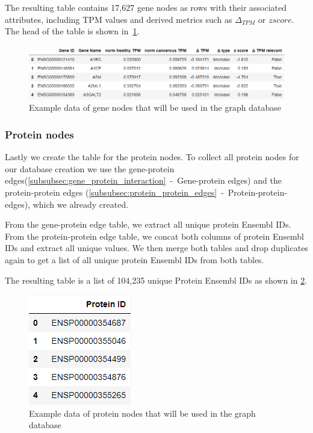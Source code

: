 The resulting table contains 17,627 gene nodes as rows with their associated attributes,
including TPM values and derived metrics such as $\Delta_{TPM}$ or $z score$.
The head of the table is shown in~\cref{fig:03_02_df_gene_nodes}.

\begin{figure}[h]
    \centering
    \includegraphics[height=\dfheight]{figures/03_02_gene_nodes}
    \caption{Example data of gene nodes that will be used in the graph database}
    \label{fig:03_02_df_gene_nodes}
\end{figure}




\subsubsection*{Protein nodes} \label{subsubsec:protein_nodes}
Lastly we create the table for the protein nodes.
To collect all protein nodes for our database creation we use the gene-protein edges(\cref{subsubsec:gene_protein_interaction}~-~Gene-protein edges)
and the protein-protein edges (\ref{subsubsec:protein_protein_edges}~-~Protein-protein-edges), which we already created.

From the gene-protein edge table, we extract all unique protein Ensembl IDs.
From the protein-protein edge table, we concat both columns of protein Ensembl IDs and extract all unique values.
We then merge both tables and drop duplicates again to get a list of all unique protein Ensembl IDs from both tables.

The resulting table is a list of 104,235 unique Protein Ensembl IDs as shown in \cref{fig:03_02_df_protein_nodes}.

\begin{figure}[h]
    \centering
    \includegraphics[height=\dfheight]{figures/03_02_protein_nodes}
    \caption{Example data of protein nodes that will be used in the graph database}
    \label{fig:03_02_df_protein_nodes}
\end{figure}


